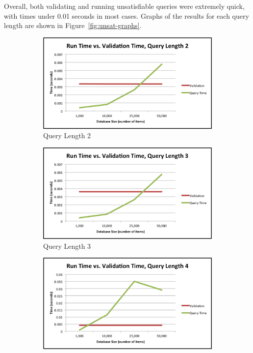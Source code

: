\documentclass{achemso}
\begin{document}
Overall, both validating and running unsatisfiable queries were extremely quick, with times under 0.01 seconds in most cases. Graphs of the results for each query length are shown in Figure~\ref{fig:unsat-graphs}.

\begin{figure}
\begin{subfigure}[b]{0.45\textwidth}
\centering
\includegraphics[width=\textwidth]{charts/unsat_2_graph}
\caption{Query Length 2}
\label{fig:unsat2}
\end{subfigure}%
\quad
\begin{subfigure}[b]{0.45\textwidth}
\centering
\includegraphics[width=\textwidth]{charts/unsat_3_graph}
\caption{Query Length 3}
\label{fig:unsat3}
\end{subfigure}
\quad
\begin{subfigure}[b]{0.45\textwidth}
\centering
\includegraphics[width=\textwidth]{charts/unsat_4_graph}

\end{subfigure}
\end{figure}
\end{document}
